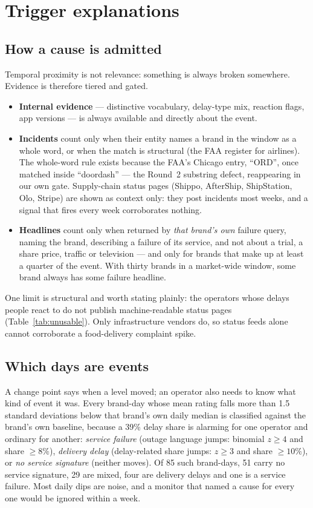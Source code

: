 \documentclass[11pt,a4paper]{article}
\begin{document}
\section{Trigger explanations}\label{sec:triggers}

\subsection{How a cause is admitted}

Temporal proximity is not relevance: something is always broken somewhere. Evidence is therefore tiered and gated.
\begin{itemize}
\item \textbf{Internal evidence} --- distinctive vocabulary, delay-type mix, reaction flags, app versions --- is always available and directly about the event.
\item \textbf{Incidents} count only when their entity names a brand in the window as a whole word, or when the match is structural (the FAA register for airlines). The whole-word rule exists because the FAA's Chicago entry, ``ORD'', once matched inside ``doordash'' --- the Round~2 substring defect, reappearing in our own gate. Supply-chain status pages (Shippo, AfterShip, ShipStation, Olo, Stripe) are shown as context only: they post incidents most weeks, and a signal that fires every week corroborates nothing.
\item \textbf{Headlines} count only when returned by \emph{that brand's own} failure query, naming the brand, describing a failure of its service, and not about a trial, a share price, traffic or television --- and only for brands that make up at least a quarter of the event. With thirty brands in a market-wide window, some brand always has some failure headline.
\end{itemize}
One limit is structural and worth stating plainly: the operators whose delays people react to do not publish machine-readable status pages (Table~\ref{tab:unusable}). Only infrastructure vendors do, so status feeds alone cannot corroborate a food-delivery complaint spike.

\subsection{Which days are events}

A change point says when a level moved; an operator also needs to know what kind of event it was. Every brand-day whose mean rating falls more than 1.5 standard deviations below that brand's own daily median is classified against the brand's own baseline, because a 39\% delay share is alarming for one operator and ordinary for another: \emph{service failure} (outage language jumps: binomial $z\geq4$ and share $\geq8\%$), \emph{delivery delay} (delay-related share jumps: $z\geq3$ and share $\geq10\%$), or \emph{no service signature} (neither moves). Of 85 such brand-days, 51 carry no service signature, 29 are mixed, four are delivery delays and one is a service failure. Most daily dips are noise, and a monitor that named a cause for every one would be ignored within a week.
\end{document}
